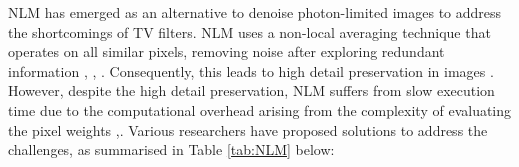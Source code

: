  \gls{NLM} has emerged as an alternative to denoise photon-limited images to address the shortcomings of \gls{TV} filters. \gls{NLM} uses a non-local averaging technique that operates on all similar pixels, removing noise after exploring redundant information \cite{juneja_denoising_2024}, \cite{khan_new_2016}, \cite{rodrigues_denoising_2008}. Consequently, this leads to high detail preservation in images \cite{rodrigues_denoising_2008}. However, despite the high detail preservation, \gls{NLM} suffers from slow execution time due to the computational overhead arising from the complexity of evaluating the pixel weights \cite{juneja_denoising_2024},\cite{rodrigues_denoising_2008}. Various researchers have proposed solutions to address the challenges, as summarised in Table \ref{tab:NLM} below:


